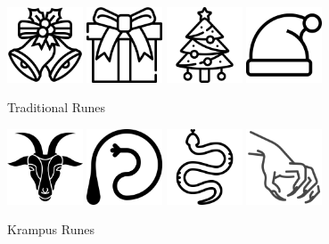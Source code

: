 \documentclass{article}
\begin{document}
\begin{multicols*}{2}
	\begin{figure}
	\centering
	\includegraphics[width=0.2\textwidth]{images/bell}
	\includegraphics[width=0.2\textwidth]{images/giftbox}
	\includegraphics[width=0.2\textwidth]{images/christmas-tree}
	\includegraphics[width=0.2\textwidth]{images/santa-hat}
	\caption{Traditional Runes}
	\end{figure}
	
	\begin{figure}
	\centering
	\includegraphics[width=0.2\textwidth]{images/goat}
	\includegraphics[width=0.2\textwidth]{images/whip}
	\includegraphics[width=0.2\textwidth]{images/snake}
	\includegraphics[width=0.2\textwidth]{images/hand}
	\caption{Krampus Runes}
	\end{figure}	
	

\end{multicols*}
\end{document}
